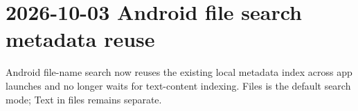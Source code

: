 \documentclass{article}
\begin{document}
\section*{2026-10-03 Android file search metadata reuse}
Android file-name search now reuses the existing local metadata index across app launches and no longer waits for text-content indexing. Files is the default search mode; Text in files remains separate.
\end{document}
